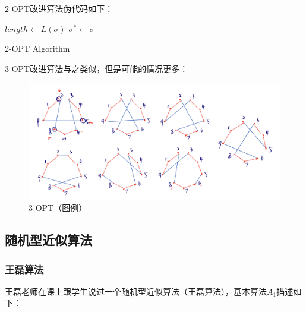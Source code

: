 \documentclass[12pt]{ctexart}
\begin{document}
2-OPT改进算法伪代码如下：

\IncMargin{1em}
\begin{algorithm}[H]

    \Output{$\sigma^*$}
    \BlankLine
    $length \leftarrow L(\sigma)$\;
    $\sigma^* \leftarrow \sigma$\;
    \caption{2-OPT Algorithm}
\end{algorithm}
\DecMargin{1em}

3-OPT改进算法与之类似，但是可能的情况更多：
\begin{figure}[htbp]
    \centering
    \includegraphics[width=1.0\linewidth]{3-opt.jpeg}
    \caption{3-OPT（图例）}
\end{figure}

\subsection{随机型近似算法}

\subsubsection{王磊算法}

王磊老师在课上跟学生说过一个随机型近似算法（王磊算法），基本算法$A_1$描述如下：
\end{document}
